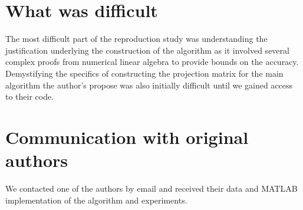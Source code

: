 \section*{What was difficult}

The most difficult part of the reproduction study was understanding the justification underlying the construction of the algorithm as it involved several complex proofs from numerical linear algebra to provide bounds on the accuracy. Demystifying the specifics of constructing the projection matrix for the main algorithm the author's propose was also initially difficult until we gained access to their code.

\section*{Communication with original authors}

We contacted one of the authors by email and received their data and MATLAB implementation of the algorithm and experiments.
